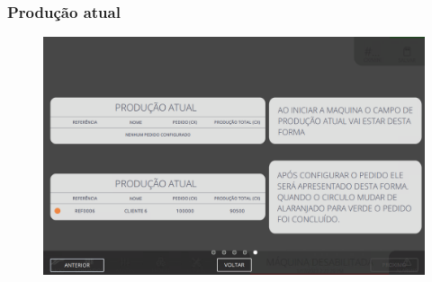 \newpage
\thispagestyle{fancy}
\vspace*{40 pt}
\subsubsection{\small{Produção atual}} \label{sec:telaPrincipalProducaoAtual}
\vspace*{\fill}
\begin{figure}[h]
    \centering
    \includegraphics[width=576 px,height=360 px]{src/imagesICV/01-main/6.png}
\end{figure}
\vspace*{\fill}
